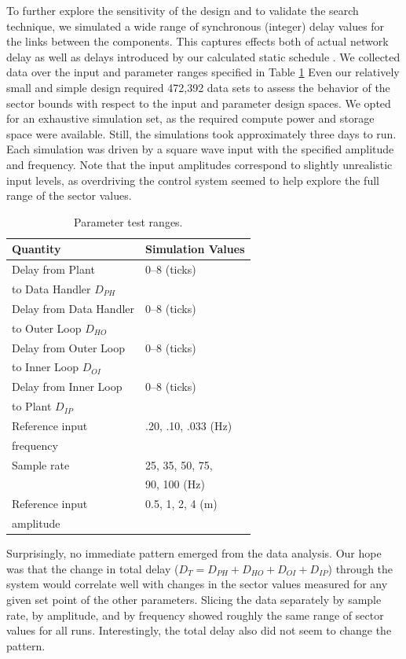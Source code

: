 To further explore the sensitivity of the design and to validate the search technique,
we simulated a wide range of synchronous (integer) delay values for the links between the 
components.  This captures effects both of actual network delay as well as delays 
introduced by our calculated static schedule \cite{sched:analysis}.
We collected data over the input and parameter ranges specified in Table \ref{tab:testparams} 
Even our relatively small and simple design required 472,392 data sets to assess the 
behavior of the sector bounds with respect to the input and parameter design spaces.
We opted for an exhaustive simulation set, as the required compute power and storage space were
available.  Still, the simulations took approximately three days to run.
Each simulation was driven by a square wave input with the specified amplitude and 
frequency.  Note that the input amplitudes correspond to slightly unrealistic input levels, as
overdriving the control system seemed to help explore the full range of the sector values.

\begin{table}[htb]
\centering
\begin{tabular}[width=\columnwidth]{ | l | l | }
\hline
\textbf{Quantity} & \textbf{Simulation Values} \\
\hline
Delay from Plant & 0--8 (ticks)  \\
 to Data Handler $D_{PH}$ & \\
\hline
Delay from Data Handler & 0--8 (ticks)  \\
 to Outer Loop $D_{HO}$ & \\
\hline
Delay from Outer Loop & 0--8 (ticks)  \\
 to Inner Loop $D_{OI}$ & \\
\hline
Delay from Inner Loop & 0--8 (ticks)  \\
  to Plant $D_{IP}$ & \\
\hline
Reference input & .20, .10, .033 (Hz) \\
frequency & \\
\hline
Sample rate & 25, 35, 50, 75,  \\
 & 90, 100 (Hz) \\
\hline
Reference input & 0.5, 1, 2, 4 (m)  \\
 amplitude & \\
\hline
\end{tabular}
\caption{ Parameter test ranges. }
\label{tab:testparams}
\end{table}

Surprisingly, no immediate pattern emerged from the data analysis. Our hope was that the
change in total delay ($D_T = D_{PH} + D_{HO} + D_{OI} + D_{IP}$) through the system would 
correlate well with changes in the sector values measured for any given set point of the 
other parameters.  Slicing the data separately by sample rate, by amplitude, and by 
frequency showed roughly the same range of sector values for all runs.  Interestingly, the 
total delay also did not seem to change the pattern. 

